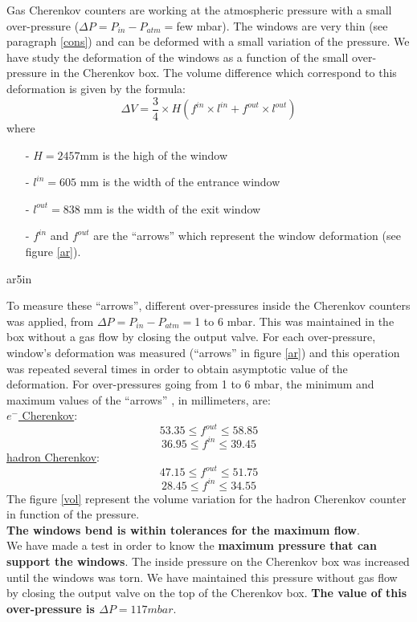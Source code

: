 \documentclass[12pt]{article}
\begin{document}
\label{toto}
Gas Cherenkov counters are working at the atmospheric pressure with a small
over-pressure ($\Delta P=P_{in}-P_{atm}=$few mbar). The windows are
 very thin (see paragraph \ref{cons})
and can be deformed with a small variation of the pressure.
We have study the deformation of the windows as a function of the 
small over-pressure in the Cherenkov box. The volume difference which correspond
to this deformation is given by the formula:
$$\Delta V=\frac{3}{4} \times H (f^{in} \times l^{in}+f^{out} \times l^{out})$$
where 
\begin{itemize}
\item[-] $H=2457$mm is the high of the window 
\item[-] $l^{in}=605$ mm is the width of the entrance window
\item[-] $l^{out}=838$ mm is the width of the exit window
\item[-] $f^{in}$ and $f^{out}$ are the ``arrows'' which represent the window 
deformation (see figure \ref{ar}).
\end{itemize}
 {ar}{5in}

To measure these ``arrows'', different over-pressures inside the
Cherenkov counters was applied, from $\Delta P=P_{in}-P_{atm}=$1 to 6 mbar. This
was maintained in the box without a gas flow by closing the output valve. For 
each over-pressure, window's deformation was measured 
(``arrows'' in figure \ref{ar}) and this operation was repeated several times
in order to obtain asymptotic value of the deformation. For over-pressures
 going from 1 to 6 mbar, the minimum and maximum values of the ``arrows'' 
, in millimeters, are:\\
\underline{$e^-$ Cherenkov}:\\
$$53.35 \leq f^{out} \leq 58.85 $$
$$36.95 \leq f^{in} \leq 39.45 $$
\underline{hadron Cherenkov}:\\
$$47.15 \leq f^{out} \leq  51.75$$
$$28.45 \leq f^{in} \leq 34.55 $$
The figure \ref{vol} represent the volume variation for the hadron Cherenkov 
counter in function of the pressure.\\
{\bf The windows bend is within tolerances for the maximum flow}.\\
We have made a test in order to know the {\bf maximum pressure that can 
support the windows}. The inside pressure on the Cherenkov box was 
increased until the
windows was torn. We have maintained this pressure without gas flow by closing
the output valve on the top of the Cherenkov box. {\bf The value of this 
over-pressure is $\Delta P=117 mbar$}. 
\end{document}
